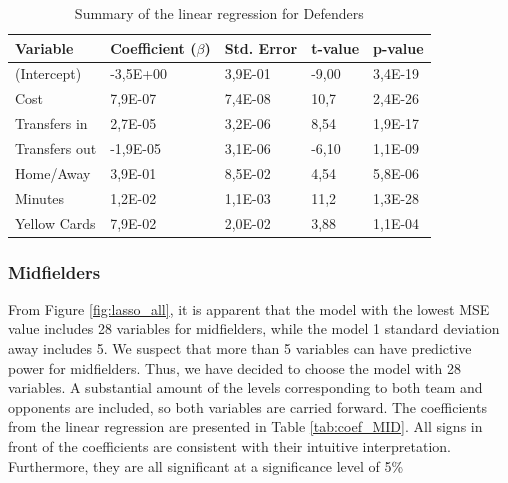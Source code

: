 \begin{table}[H]
\centering
\begin{tabular}{|l|l|l|l|l|}
\hline
Variable      & Coefficient ($\beta$) & Std. Error & t-value & p-value \\ \hline
(Intercept)   & -3,5E+00     & 3,9E-01    & -9,00    & 3,4E-19 \\
Cost          & 7,9E-07      & 7,4E-08    & 10,7    & 2,4E-26 \\
Transfers in  & 2,7E-05      & 3,2E-06    & 8,54     & 1,9E-17 \\
Transfers out & -1,9E-05     & 3,1E-06    & -6,10    & 1,1E-09 \\
Home/Away     & 3,9E-01      & 8,5E-02    & 4,54     & 5,8E-06 \\
Minutes       & 1,2E-02      & 1,1E-03    & 11,2    & 1,3E-28 \\
Yellow Cards  & 7,9E-02      & 2,0E-02    & 3,88     & 1,1E-04 \\
\hline
\end{tabular}
\caption{Summary of the linear regression for Defenders}
\label{tab:coef_DEF}
\end{table}


\subsubsection{Midfielders}
From Figure \ref{fig:lasso_all}, it is apparent that the model with the lowest MSE value includes 28 variables for midfielders, while the model 1 standard deviation away includes 5. We suspect that more than 5 variables can have predictive power for midfielders. Thus, we have decided to choose the model with 28 variables. A substantial amount of the levels corresponding to both team and opponents are included, so both variables are carried forward. The coefficients from the linear regression are presented in Table \ref{tab:coef_MID}. All signs in front of the coefficients are consistent with their intuitive interpretation. Furthermore, they are all significant at a significance level of 5\%

